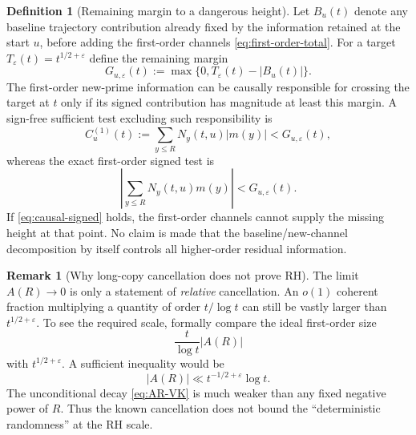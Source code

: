 \documentclass[11pt,reqno]{amsart}
\theoremstyle{plain}
\theoremstyle{definition}
\newtheorem{definition}[theorem]{Definition}
\newtheorem{remark}[theorem]{Remark}
\newcommand{\eps}{\varepsilon}
\begin{document}
\begin{definition}[Remaining margin to a dangerous height]
\label{def:remaining-margin}
Let $B_u(t)$ denote any baseline trajectory contribution already fixed by the
information retained at the start $u$, before adding the first-order channels
\eqref{eq:first-order-total}.  For a target
$T_\eps(t)=t^{1/2+\eps}$ define the remaining margin
\begin{equation}
\label{eq:margin-def}
  G_{u,\eps}(t):=
  \max\bigl\{0,T_\eps(t)-|B_u(t)|\bigr\}.
\end{equation}
The first-order new-prime information can be causally responsible for crossing
the target at $t$ only if its signed contribution has magnitude at least this
margin.  A sign-free sufficient test excluding such responsibility is
\begin{equation}
\label{eq:causal-capacity}
  C_u^{(1)}(t):=
  \sum_{y\le R}N_y(t,u)|m(y)|<G_{u,\eps}(t),
\end{equation}
whereas the exact first-order signed test is
\begin{equation}
\label{eq:causal-signed}
  \left|\sum_{y\le R}N_y(t,u)m(y)\right|
  <G_{u,\eps}(t).
\end{equation}
If \eqref{eq:causal-signed} holds, the first-order channels cannot supply the
missing height at that point.  No claim is made that the baseline/new-channel
decomposition by itself controls all higher-order residual information.
\end{definition}

\begin{remark}[Why long-copy cancellation does not prove RH]
\label{rem:copy-cancellation-not-RH}
The limit $A(R)\to0$ is only a statement of \emph{relative} cancellation.
An $o(1)$ coherent fraction multiplying a quantity of order $t/\log t$ can
still be vastly larger than $t^{1/2+\eps}$.  To see the required scale,
formally compare the ideal first-order size
\[
  \frac{t}{\log t}|A(R)|
\]
with $t^{1/2+\eps}$.  A sufficient inequality would be
\begin{equation}
\label{eq:AR-required-t}
  |A(R)|\ll t^{-1/2+\eps}\log t.
\end{equation}
The unconditional decay \eqref{eq:AR-VK} is much weaker than any fixed
negative power of $R$.  Thus the known cancellation does not bound the
``deterministic randomness'' at the RH scale.
\end{remark}
\end{document}
